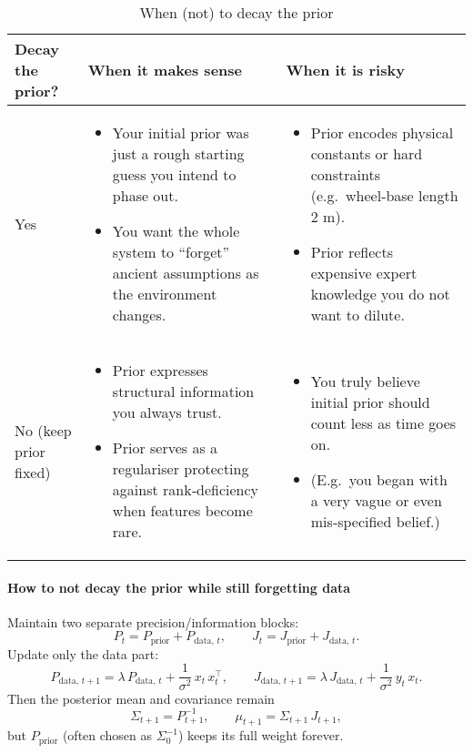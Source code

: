 \documentclass[11pt]{article}
\begin{document}
\begin{table}[ht]
  \small
  \centering
  \begin{tabularx}{\textwidth}{l X X}
    \toprule
    Decay the prior? & When it makes sense & When it is risky \\
    \midrule
    Yes 
      & \begin{itemize}[nosep,left=0pt]
          \item Your initial prior was just a rough starting guess you intend to phase out.
          \item You want the whole system to “forget” ancient assumptions as the environment changes.
        \end{itemize}
      & \begin{itemize}[nosep,left=0pt]
          \item Prior encodes physical constants or hard constraints (e.g.\ wheel‐base length 2 m).
          \item Prior reflects expensive expert knowledge you do not want to dilute.
        \end{itemize} \\[1ex]
    No (keep prior fixed)
      & \begin{itemize}[nosep,left=0pt]
          \item Prior expresses structural information you always trust.
          \item Prior serves as a regulariser protecting against rank‐deficiency when features become rare.
        \end{itemize}
      & \begin{itemize}[nosep,left=0pt]
          \item You truly believe initial prior should count less as time goes on.
          \item (E.g.\ you began with a very vague or even mis‐specified belief.)
        \end{itemize} \\
    \bottomrule
  \end{tabularx}
  \caption{When (not) to decay the prior}
  \label{tab:prior-decay}
\end{table}

\paragraph{How to not decay the prior while still forgetting data}

Maintain two separate precision/information blocks:
\[
P_t = P_{\mathrm{prior}} + P_{\mathrm{data},\,t},
\qquad
J_t = J_{\mathrm{prior}} + J_{\mathrm{data},\,t}.
\]
Update only the data part:
\[
P_{\mathrm{data},\,t+1}
= \lambda\,P_{\mathrm{data},\,t}
+ \frac{1}{\sigma^2}\,x_t\,x_t^\top,
\qquad
J_{\mathrm{data},\,t+1}
= \lambda\,J_{\mathrm{data},\,t}
+ \frac{1}{\sigma^2}\,y_t\,x_t.
\]
Then the posterior mean and covariance remain
\[
\Sigma_{t+1} = P_{t+1}^{-1},
\qquad
\mu_{t+1} = \Sigma_{t+1}\,J_{t+1},
\]
but \(P_{\mathrm{prior}}\) (often chosen as \(\Sigma_0^{-1}\)) keeps its full weight forever.
\end{document}
